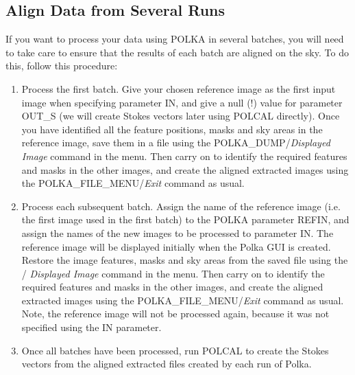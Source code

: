 \subsection {Align Data from Several Runs}
If you want to process your data using POLKA in several batches, you will
need to take care to ensure that the results of each batch are aligned on
the sky. To do this, follow this procedure:

\begin{enumerate}

\item Process the first batch. Give your chosen reference image as the 
first input image when specifying parameter IN, and give a null (!) value
for parameter OUT\_S (we will create Stokes vectors later using POLCAL
directly). Once you have identified all the feature positions, masks and
sky areas in the reference image, save them in a file using the
 {POLKA_DUMP}/{\em Displayed Image} command in the
 menu. Then carry on to identify the 
required features and masks in the other images, and create the
aligned extracted images using the 
{POLKA_FILE_MENU}/{\em Exit} command as usual.

\item Process each subsequent batch. Assign the name of the reference
image (i.e. the first image used in the first batch) to the POLKA
parameter REFIN, and assign the names of the new images to be processed
to parameter IN. The reference image will be displayed initially when the
Polka GUI is created. Restore the image features, masks and sky areas
from the saved file using the /{\em
Displayed Image} command in the 
menu. Then carry on to identify the required features and masks in the
other images, and create the aligned extracted images using the
 {POLKA_FILE_MENU}/{\em Exit} command as usual. Note,
the reference image will not be processed again, because it was not
specified using the IN parameter.

\item Once all batches have been processed, run POLCAL to create the
Stokes vectors from the aligned extracted files created by each run of
Polka.

\end{enumerate}

